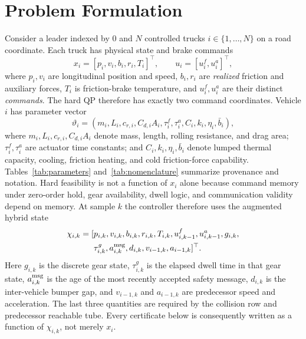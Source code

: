 \section{Problem Formulation}
Consider a leader indexed by $0$ and $N$ controlled trucks $i\in\{1,\ldots,N\}$ on a road coordinate. Each truck has physical state and brake commands
\begin{equation}
x_i=[p_i,v_i,b_i,r_i,T_i]^\top,\qquad
u_i=[u_i^f,u_i^a]^\top,
\end{equation}
where $p_i,v_i$ are longitudinal position and speed, $b_i,r_i$ are \emph{realized} friction and auxiliary forces, $T_i$ is friction-brake temperature, and $u_i^f,u_i^a$ are their distinct \emph{commands}. The hard QP therefore has exactly two command coordinates. Vehicle $i$ has parameter vector
\begin{equation}
\vartheta_i=(m_i,L_i,c_{r,i},C_{d,i}A_i,\tau_i^f,\tau_i^a,C_i,k_i,\eta_i,\bar b_i),
\end{equation}
where $m_i,L_i,c_{r,i},C_{d,i}A_i$ denote mass, length, rolling resistance, and drag area; $\tau_i^f,\tau_i^a$ are actuator time constants; and $C_i,k_i,\eta_i,\bar b_i$ denote lumped thermal capacity, cooling, friction heating, and cold friction-force capability. Tables~\ref{tab:parameters} and~\ref{tab:nomenclature} summarize provenance and notation.
Hard feasibility is not a function of $x_i$ alone because command memory under zero-order hold, gear availability, dwell logic, and communication validity depend on memory. At sample $k$ the controller therefore uses the augmented hybrid state
\begin{equation}\label{eq:chi}
\begin{aligned}
\chi_{i,k}=[&p_{i,k},v_{i,k},b_{i,k},r_{i,k},T_{i,k},
u^f_{i,k-1},u^a_{i,k-1},g_{i,k},\\
&\tau^g_{i,k},a^{\rm msg}_{i,k},d_{i,k},
v_{i-1,k},a_{i-1,k}]^\top .
\end{aligned}
\end{equation}
Here $g_{i,k}$ is the discrete gear state, $\tau^g_{i,k}$ is the elapsed dwell time in that gear state, $a^{\rm msg}_{i,k}$ is the age of the most recently accepted safety message, $d_{i,k}$ is the inter-vehicle bumper gap, and $v_{i-1,k}$ and $a_{i-1,k}$ are predecessor speed and acceleration. The last three quantities are required by the collision row and predecessor reachable tube. Every certificate below is consequently written as a function of $\chi_{i,k}$, not merely $x_i$.

